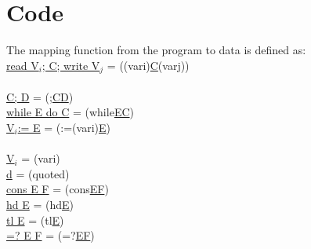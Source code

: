 \section{Code \WHILE}\label{appendix:code while}
The mapping function from the \WHILE program to \WHILE data is defined as:\\
\indent\hspace{3cm}\underline{read V$_i$; C; write V$_j$}\hspace{0.5cm} = \hspace{0.5cm} ((vari)\underline{C}(varj))\\\\
\indent\hspace{3cm}\underline{C; D}\hspace{3.3cm} = \hspace{0.5cm} (;\underline{CD})\\
\indent\hspace{3cm}\underline{while E do C}\hspace{1.8cm} = \hspace{0.5cm} (while\underline{EC})\\
\indent\hspace{3cm}\underline{V$_i$:= E}\hspace{2.9cm} = \hspace{0.5cm} (:=(vari)\underline{E})\\\\
\indent\hspace{3cm}\underline{V$_i$}\hspace{3.75cm} = \hspace{0.5cm} (vari)\\
\indent\hspace{3cm}\underline{d}\hspace{3.95cm} = \hspace{0.5cm} (quoted)\\
\indent\hspace{3cm}\underline{cons E F}\hspace{2.6cm} = \hspace{0.5cm} (cons\underline{EF})\\
\indent\hspace{3cm}\underline{hd E}\hspace{3.33cm} = \hspace{0.5cm} (hd\underline{E})\\
\indent\hspace{3cm}\underline{tl E}\hspace{3.5cm} = \hspace{0.5cm} (tl\underline{E})\\
\indent\hspace{3cm}\underline{=? E F}\hspace{2.8cm} = \hspace{0.5cm} (=?\underline{EF})\\
